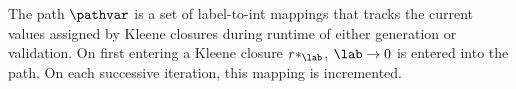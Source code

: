 


The path $\pathvar$ is a set of label-to-int mappings that tracks
the current values assigned by Kleene closures during runtime
of either generation or validation.
On first entering a Kleene closure $r*_\lab$,
$\lab \rightarrow 0$ is entered into the path.
On each successive iteration, this mapping is incremented.

